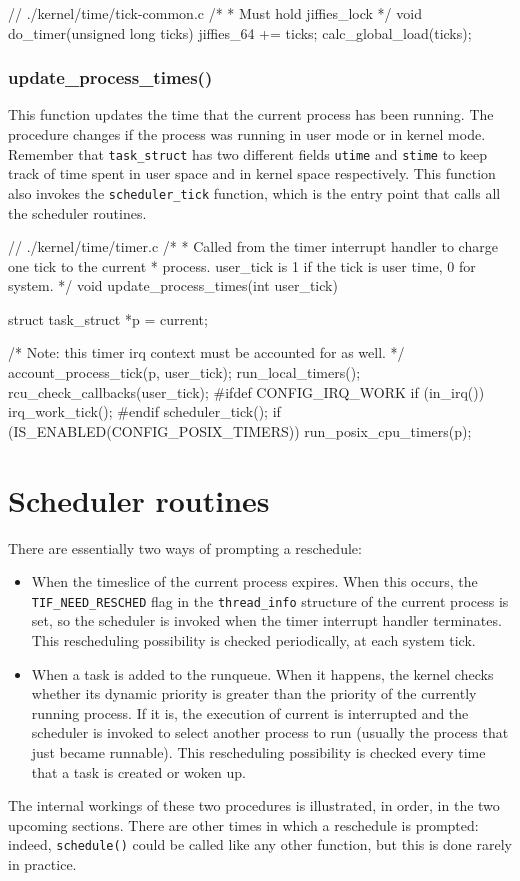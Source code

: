 \begin{code}
// ./kernel/time/tick-common.c
/*
 * Must hold jiffies_lock
 */
void do_timer(unsigned long ticks)
{
	jiffies_64 += ticks;
	calc_global_load(ticks);
}
\end{code}

\subsubsection{update\_process\_times()}
This function updates the time that the current process has been running. The procedure changes if the process was running in user mode or in kernel mode. Remember that \verb|task_struct| has two different fields \verb|utime| and \verb|stime| to keep track of time spent in user space and in kernel space respectively. This function also invokes the \verb|scheduler_tick| function, which is the entry point that calls all the scheduler routines.

\begin{code}
// ./kernel/time/timer.c
/*
 * Called from the timer interrupt handler to charge one tick to the current
 * process.  user_tick is 1 if the tick is user time, 0 for system.
 */
void update_process_times(int user_tick)
{
	struct task_struct *p = current;

	/* Note: this timer irq context must be accounted for as well. */
	account_process_tick(p, user_tick);
	run_local_timers();
	rcu_check_callbacks(user_tick);
#ifdef CONFIG_IRQ_WORK
	if (in_irq())
		irq_work_tick();
#endif
	scheduler_tick();
	if (IS_ENABLED(CONFIG_POSIX_TIMERS))
		run_posix_cpu_timers(p);
}
\end{code}

\section{Scheduler routines}
There are essentially two ways of prompting a reschedule:
\begin{itemize}
    \item When the timeslice of the current process expires. When this occurs, the \verb|TIF_NEED_RESCHED|
    flag in the \verb|thread_info| structure of the current process is set, so the scheduler is
    invoked when the timer interrupt handler terminates.\cite{cesati} This rescheduling possibility is checked periodically, at each system tick.
    \item When a task is added to the runqueue. When it happens, the kernel checks whether its dynamic priority is
    greater than the priority of the currently running process. If it is, the execution of
    current is interrupted and the scheduler is invoked to select another process to run
    (usually the process that just became runnable).\cite{cesati} This rescheduling possibility is checked every time that a task is created or woken up.
\end{itemize}
The internal workings of these two procedures is illustrated, in order, in the two upcoming sections. There are other times in which a reschedule is prompted: indeed, \verb|schedule()| could be called like any other function, but this is done rarely in practice.

